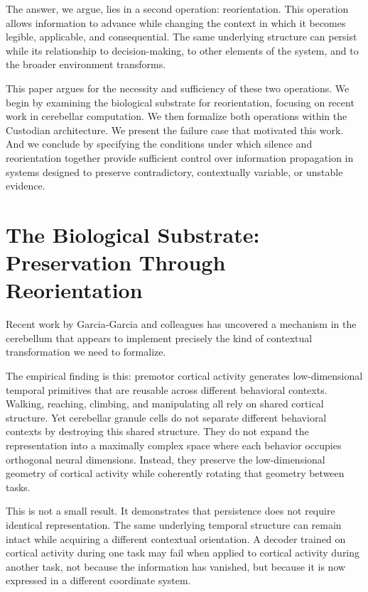 \documentclass[12pt]{article}
\begin{document}
The answer, we argue, lies in a second operation: reorientation. This operation allows information to advance while changing the context in which it becomes legible, applicable, and consequential. The same underlying structure can persist while its relationship to decision-making, to other elements of the system, and to the broader environment transforms.

This paper argues for the necessity and sufficiency of these two operations. We begin by examining the biological substrate for reorientation, focusing on recent work in cerebellar computation. We then formalize both operations within the Custodian architecture. We present the failure case that motivated this work. And we conclude by specifying the conditions under which silence and reorientation together provide sufficient control over information propagation in systems designed to preserve contradictory, contextually variable, or unstable evidence.

\section{The Biological Substrate: Preservation Through Reorientation}

Recent work by Garcia-Garcia and colleagues has uncovered a mechanism in the cerebellum that appears to implement precisely the kind of contextual transformation we need to formalize.\cite{garcia2026}

The empirical finding is this: premotor cortical activity generates low-dimensional temporal primitives that are reusable across different behavioral contexts. Walking, reaching, climbing, and manipulating all rely on shared cortical structure. Yet cerebellar granule cells do not separate different behavioral contexts by destroying this shared structure. They do not expand the representation into a maximally complex space where each behavior occupies orthogonal neural dimensions. Instead, they preserve the low-dimensional geometry of cortical activity while coherently rotating that geometry between tasks.

This is not a small result. It demonstrates that persistence does not require identical representation. The same underlying temporal structure can remain intact while acquiring a different contextual orientation. A decoder trained on cortical activity during one task may fail when applied to cortical activity during another task, not because the information has vanished, but because it is now expressed in a different coordinate system.
\end{document}
